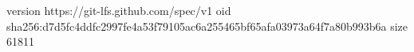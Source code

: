 version https://git-lfs.github.com/spec/v1
oid sha256:d7d5fc4ddfc2997fe4a53f79105ac6a255465bf65afa03973a64f7a80b993b6a
size 61811
